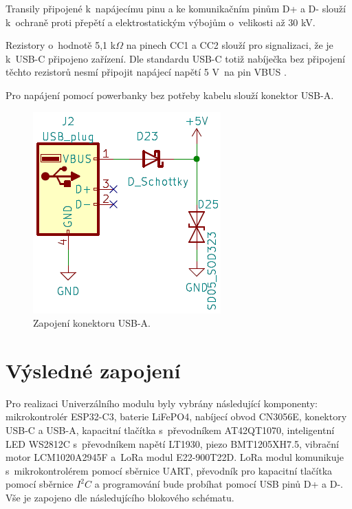 Transily připojené k~napájecímu pinu a ke komunikačním pinům D+ a D- slouží k~ochraně proti přepětí a elektrostatickým výbojům o~velikosti až 30 kV. 

Rezistory o~hodnotě 5,1 k$\Omega$ na pinech CC1 a CC2 slouží pro signalizaci, že je k~USB-C připojeno zařízení. Dle standardu USB-C totiž nabíječka bez 
připojení těchto rezistorů nesmí připojit napájecí napětí 5 V~na pin VBUS \cite{USB-C}. 

Pro napájení pomocí powerbanky bez potřeby kabelu slouží konektor USB-A. 

\begin{figure}[!h]
  \begin{center}
    \includegraphics[scale=0.6]{obrazky/USB_A.png}
  \end{center}
  \caption[Zapojení konektoru USB-A]{Zapojení konektoru USB-A.}
\end{figure}

\section{Výsledné zapojení}
Pro realizaci Univerzálního modulu byly vybrány následující komponenty: mikrokontrolér ESP32-C3, baterie LiFePO4, nabíjecí obvod CN3056E, konektory USB-C a USB-A,
kapacitní tlačítka s~převodníkem AT42QT1070, inteligentní LED WS2812C s~převodníkem napětí LT1930, piezo BMT1205XH7.5, vibrační motor LCM1020A2945F a~LoRa modul 
E22-900T22D. LoRa modul komunikuje 
s~mikrokontrolérem pomocí sběrnice UART, převodník pro kapacitní tlačítka pomocí sběrnice $I^2C$ a programování bude probíhat pomocí USB pinů D+ a D-. Vše je 
zapojeno dle následujícího blokového schématu. 

